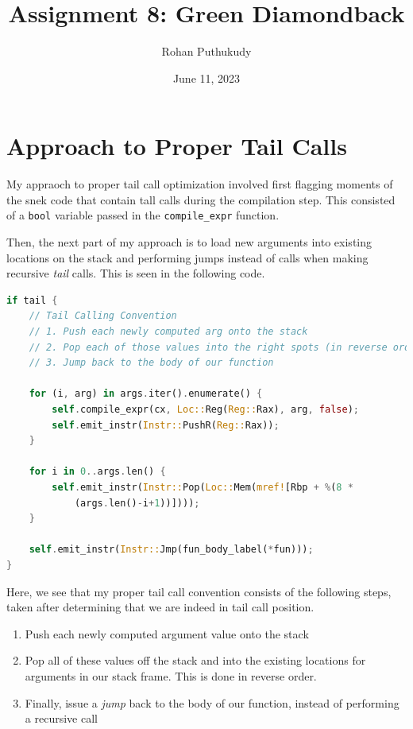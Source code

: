 \documentclass[12pt]{article}
\begin{document}
\title{Assignment 8: Green Diamondback}
\author{Rohan Puthukudy}
\date{June 11, 2023}
\maketitle

\section{Approach to Proper Tail Calls}
    My appraoch to proper tail call optimization involved first flagging moments of the snek code that contain
    tall calls during the compilation step. This consisted of a \verb|bool| variable passed in the
    \verb|compile_expr| function. \newline

    Then, the next part of my approach is to load new arguments into existing locations on the stack and
    performing jumps instead of calls when making recursive \textit{tail} calls. This is seen in the following
    code.
    \begin{lstlisting}[firstnumber=368, language=rust]
if tail {
    // Tail Calling Convention
    // 1. Push each newly computed arg onto the stack
    // 2. Pop each of those values into the right spots (in reverse order)
    // 3. Jump back to the body of our function

    for (i, arg) in args.iter().enumerate() {
        self.compile_expr(cx, Loc::Reg(Reg::Rax), arg, false);
        self.emit_instr(Instr::PushR(Reg::Rax));
    }

    for i in 0..args.len() {
        self.emit_instr(Instr::Pop(Loc::Mem(mref![Rbp + %(8 * 
            (args.len()-i+1))])));
    }

    self.emit_instr(Instr::Jmp(fun_body_label(*fun)));
}\end{lstlisting}
    Here, we see that my proper tail call convention consists of the following steps, taken after determining
    that we are indeed in tail call position.
    \begin{enumerate}
        \item Push each newly computed argument value onto the stack
        \item Pop all of these values off the stack and into the existing locations for arguments in our stack
            frame. This is done in reverse order.
        \item Finally, issue a \textit{jump} back to the body of our function, instead of performing a
            recursive call
    \end{enumerate}
\end{document}
